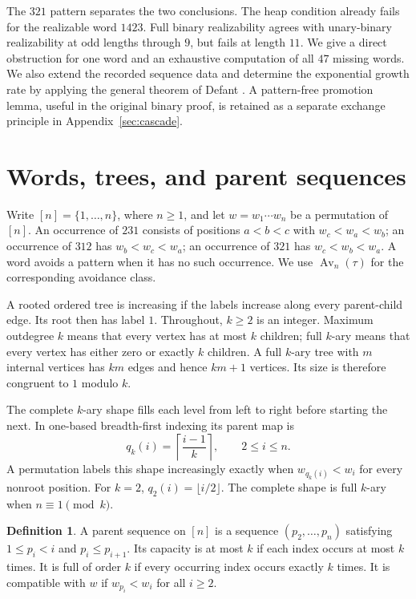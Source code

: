 \documentclass[11pt]{article}
\theoremstyle{definition}
\newtheorem{definition}[theorem]{Definition}
\newcommand{\Av}{\operatorname{Av}}
\begin{document}
The $321$ pattern separates the two conclusions. The heap condition already fails for the realizable word $1423$. Full binary realizability agrees with unary-binary realizability at odd lengths through $9$, but fails at length $11$. We give a direct obstruction for one word and an exhaustive computation of all $47$ missing words. We also extend the recorded sequence data and determine the exponential growth rate by applying the general theorem of Defant \cite{Defant2019}. A pattern-free promotion lemma, useful in the original binary proof, is retained as a separate exchange principle in Appendix~\ref{sec:cascade}.

\section{Words, trees, and parent sequences}\label{sec:prelim}

Write $[n]=\{1,\ldots,n\}$, where $n\ge1$, and let $w=w_1\cdots w_n$ be a permutation of $[n]$. An occurrence of $231$ consists of positions $a<b<c$ with $w_c<w_a<w_b$; an occurrence of $312$ has $w_b<w_c<w_a$; an occurrence of $321$ has $w_c<w_b<w_a$. A word avoids a pattern when it has no such occurrence. We use $\Av_n(\tau)$ for the corresponding avoidance class.

A rooted ordered tree is increasing if the labels increase along every parent-child edge. Its root then has label $1$. Throughout, $k\ge2$ is an integer. Maximum outdegree $k$ means that every vertex has at most $k$ children; full $k$-ary means that every vertex has either zero or exactly $k$ children. A full $k$-ary tree with $m$ internal vertices has $km$ edges and hence $km+1$ vertices. Its size is therefore congruent to $1$ modulo $k$.

The complete $k$-ary shape fills each level from left to right before starting the next. In one-based breadth-first indexing its parent map is
\begin{equation}
q_k(i)=\left\lceil\frac{i-1}{k}\right\rceil,\qquad 2\le i\le n.\label{eq:heap}
\end{equation}
A permutation labels this shape increasingly exactly when $w_{q_k(i)}<w_i$ for every nonroot position. For $k=2$, $q_2(i)=\lfloor i/2\rfloor$. The complete shape is full $k$-ary when $n\equiv1\pmod{k}$.

\begin{definition}
A parent sequence on $[n]$ is a sequence $(p_2,\ldots,p_n)$ satisfying $1\le p_i<i$ and $p_i\le p_{i+1}$. Its capacity is at most $k$ if each index occurs at most $k$ times. It is full of order $k$ if every occurring index occurs exactly $k$ times. It is compatible with $w$ if $w_{p_i}<w_i$ for all $i\ge2$.
\end{definition}
\end{document}
